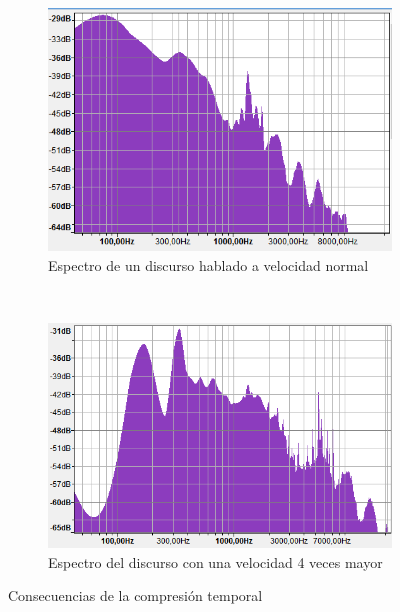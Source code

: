 \begin{figure}[H]
	\centering
	\begin{subfigure}[b]{0.4\linewidth}
		\centering
		\includegraphics[scale=0.5]{ImagenesEjercicio5/HumanSpeechNormalSpeed.PNG}
		\caption{Espectro de un discurso hablado a velocidad normal}
		\label{fig:speechNormal}
	\end{subfigure}
	~
	\begin{subfigure}[b]{0.4\linewidth}
		\centering
		\includegraphics[scale=0.5]{ImagenesEjercicio5/HumanSpeech4X.PNG}
		\caption{Espectro del discurso con una velocidad 4 veces mayor}
		\label{fig:speech4X}
	\end{subfigure}
	\caption{Consecuencias de la compresión temporal}
\end{figure}

